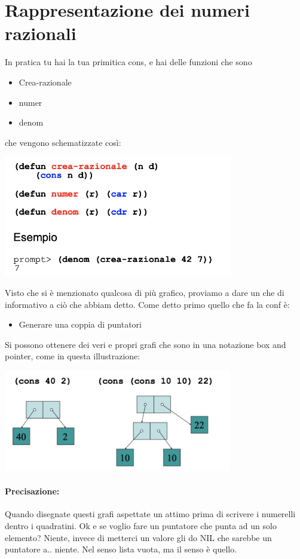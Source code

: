 \documentclass[12pt, a4paper, openany, oneside]{book}
\begin{document}
\section{Rappresentazione dei numeri razionali}
In pratica tu hai la tua primitica cons, e hai delle funzioni che sono
\begin{itemize}
	\item Crea-razionale
	\item numer
	\item denom
\end{itemize}
che vengono schematizzate così: 
\begin{center}
\includegraphics[width=0.75\textwidth]{16}
\end{center}
Visto che si è menzionato qualcosa di più grafico, proviamo a dare un che di 
informativo a ciò che abbiam detto. Come detto primo quello che fa la conf è:
\begin{itemize}
	\item Generare una coppia di puntatori
\end{itemize}
Si possono ottenere dei veri e propri grafi che sono in una notazione box and 
pointer, come in questa illustrazione:
\begin{center}
\includegraphics[width=0.75\textwidth]{17}
\end{center}
\paragraph{Precisazione: }Quando disegnate questi grafi aspettate un attimo prima
di scrivere i numerelli dentro i quadratini.
Ok e se voglio fare un puntatore che punta ad un solo elemento? Niente, invece 
di metterci un valore gli do NIL che sarebbe un puntatore a.. niente. Nel senso
lista vuota, ma il senso è quello. 
\end{document}

